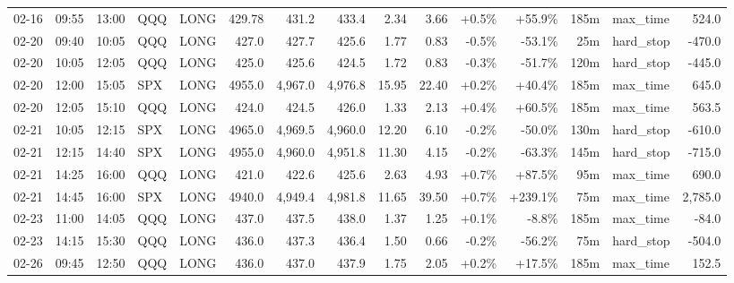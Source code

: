 \documentclass[11pt,a4paper,twoside]{article}
\begin{document}
\begin{landscape}
\begin{center}
\begin{longtable}{>{\color{txtmain}}l l l l l r r r r r r r r >{\color{txtmain}}l r}
02-16 & 09:55 & 13:00 & QQQ & LONG & 429.78 & 431.2 & 433.4 & 2.34 & 3.66 & \textcolor{wingreen}{+0.5\%} & \textcolor{wingreen}{+55.9\%} & 185m & max\_time & \textcolor{wingreen}{524.0} \\
02-20 & 09:40 & 10:05 & QQQ & LONG & 427.0 & 427.7 & 425.6 & 1.77 & 0.83 & \textcolor{lossred}{-0.5\%} & \textcolor{lossred}{-53.1\%} & 25m & hard\_stop & \textcolor{lossred}{-470.0} \\
02-20 & 10:05 & 12:05 & QQQ & LONG & 425.0 & 425.6 & 424.5 & 1.72 & 0.83 & \textcolor{lossred}{-0.3\%} & \textcolor{lossred}{-51.7\%} & 120m & hard\_stop & \textcolor{lossred}{-445.0} \\
02-20 & 12:00 & 15:05 & SPX & LONG & 4955.0 & 4,967.0 & 4,976.8 & 15.95 & 22.40 & \textcolor{wingreen}{+0.2\%} & \textcolor{wingreen}{+40.4\%} & 185m & max\_time & \textcolor{wingreen}{645.0} \\
02-20 & 12:05 & 15:10 & QQQ & LONG & 424.0 & 424.5 & 426.0 & 1.33 & 2.13 & \textcolor{wingreen}{+0.4\%} & \textcolor{wingreen}{+60.5\%} & 185m & max\_time & \textcolor{wingreen}{563.5} \\
02-21 & 10:05 & 12:15 & SPX & LONG & 4965.0 & 4,969.5 & 4,960.0 & 12.20 & 6.10 & \textcolor{lossred}{-0.2\%} & \textcolor{lossred}{-50.0\%} & 130m & hard\_stop & \textcolor{lossred}{-610.0} \\
02-21 & 12:15 & 14:40 & SPX & LONG & 4955.0 & 4,960.0 & 4,951.8 & 11.30 & 4.15 & \textcolor{lossred}{-0.2\%} & \textcolor{lossred}{-63.3\%} & 145m & hard\_stop & \textcolor{lossred}{-715.0} \\
02-21 & 14:25 & 16:00 & QQQ & LONG & 421.0 & 422.6 & 425.6 & 2.63 & 4.93 & \textcolor{wingreen}{+0.7\%} & \textcolor{wingreen}{+87.5\%} & 95m & max\_time & \textcolor{wingreen}{690.0} \\
02-21 & 14:45 & 16:00 & SPX & LONG & 4940.0 & 4,949.4 & 4,981.8 & 11.65 & 39.50 & \textcolor{wingreen}{+0.7\%} & \textcolor{wingreen}{+239.1\%} & 75m & max\_time & \textcolor{wingreen}{2,785.0} \\
02-23 & 11:00 & 14:05 & QQQ & LONG & 437.0 & 437.5 & 438.0 & 1.37 & 1.25 & \textcolor{wingreen}{+0.1\%} & \textcolor{lossred}{-8.8\%} & 185m & max\_time & \textcolor{lossred}{-84.0} \\
02-23 & 14:15 & 15:30 & QQQ & LONG & 436.0 & 437.3 & 436.4 & 1.50 & 0.66 & \textcolor{lossred}{-0.2\%} & \textcolor{lossred}{-56.2\%} & 75m & hard\_stop & \textcolor{lossred}{-504.0} \\
02-26 & 09:45 & 12:50 & QQQ & LONG & 436.0 & 437.0 & 437.9 & 1.75 & 2.05 & \textcolor{wingreen}{+0.2\%} & \textcolor{wingreen}{+17.5\%} & 185m & max\_time & \textcolor{wingreen}{152.5} \\

\end{longtable}
\end{center}
\end{landscape}
\end{document}
